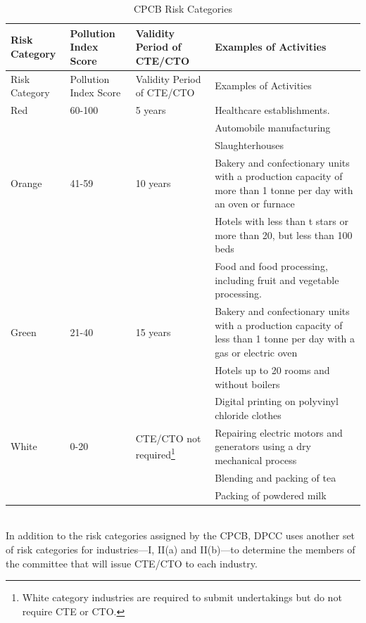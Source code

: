 \documentclass[a4paper, 12pt, twoside]{article}
\newcommand\tabitem{\makebox[1em][r]{\textbullet~}}
\begin{document}
\begin{longtable}{p{3cm}>{\raggedright}p{2.5cm}>{\raggedright}p{2.5cm}>{\raggedright\arraybackslash}p{6cm}}
\caption{CPCB Risk Categories} \\
\toprule
Risk Category & Pollution Index Score & Validity Period of CTE/CTO & Examples of Activities \\
\midrule
\endfirsthead
\toprule
Risk Category & Pollution Index Score & Validity Period of CTE/CTO & Examples of Activities \\
\midrule
\endhead
\bottomrule
\endfoot
\endlastfoot
Red & 60-100 & 5 years & \tabitem Healthcare establishments. \\
 &  &  &   \tabitem Automobile manufacturing \\
  &  &  &  \tabitem Slaughterhouses \\
Orange & 41-59 & 10 years &  \tabitem Bakery and confectionary units with a production capacity of more than 1 tonne per day with an oven or furnace  \\
 &  &  & \tabitem Hotels with less than t stars or more than 20, but less than 100 beds \\
 &  &  & \tabitem Food and food processing, including fruit and vegetable processing.  \\
Green & 21-40 & 15 years & \tabitem Bakery and confectionary units with a production capacity of less than 1 tonne per day with a gas or electric oven \\
 &  &  &  \tabitem Hotels up to 20 rooms and without boilers \\
 &  &  & \tabitem Digital printing on polyvinyl chloride clothes \\
White & 0-20 & CTE/CTO not required\footnote{White category industries are required to submit undertakings but do not require CTE or CTO.} & \tabitem Repairing electric motors and generators using a dry mechanical process \\
 &  &  & \tabitem Blending and packing of tea \\
 &  &  & \tabitem Packing of powdered milk \\
 \bottomrule
\end{longtable}
\textit{\parencite{CPCBrc}} \\
                                  
                 In addition to the risk categories assigned by the CPCB, DPCC uses another set of risk categories for industries—I, II(a) and II(b)—to determine the members of the committee that will issue CTE/CTO to each industry.\\																				
                 
\end{document}
